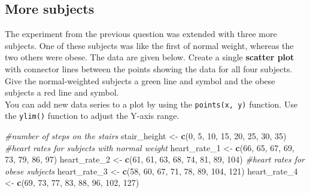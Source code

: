 \documentclass[]{book}
\newenvironment{Shaded}{\begin{snugshade}}{\end{snugshade}}
\newcommand{\CommentTok}[1]{\textcolor[rgb]{0.56,0.35,0.01}{\textit{#1}}}
\newcommand{\DecValTok}[1]{\textcolor[rgb]{0.00,0.00,0.81}{#1}}
\newcommand{\KeywordTok}[1]{\textcolor[rgb]{0.13,0.29,0.53}{\textbf{#1}}}
\newcommand{\NormalTok}[1]{#1}
\newcommand{\StringTok}[1]{\textcolor[rgb]{0.31,0.60,0.02}{#1}}
\begin{document}
\hypertarget{more-subjects}{%
\subsection{More subjects}\label{more-subjects}}

The experiment from the previous question was extended with three more subjects. One of these subjects was like the first of normal weight, whereas the two others were obese. The data are given below. Create a single \textbf{scatter plot} with connector lines between the points showing the data for all four subjects. Give the normal-weighted subjects a green line and symbol and the obese subjects a red line and symbol.\\
You can add new data series to a plot by using the \texttt{points(x,\ y)} function. Use the \texttt{ylim()} function to adjust the Y-axis range.

\begin{Shaded}
\begin{Highlighting}[]
\CommentTok{#number of steps on the stairs}
\NormalTok{stair_height <-}\StringTok{ }\KeywordTok{c}\NormalTok{(}\DecValTok{0}\NormalTok{, }\DecValTok{5}\NormalTok{, }\DecValTok{10}\NormalTok{, }\DecValTok{15}\NormalTok{, }\DecValTok{20}\NormalTok{, }\DecValTok{25}\NormalTok{, }\DecValTok{30}\NormalTok{, }\DecValTok{35}\NormalTok{)}
\CommentTok{#heart rates for subjects with normal weight}
\NormalTok{heart_rate_}\DecValTok{1}\NormalTok{ <-}\StringTok{ }\KeywordTok{c}\NormalTok{(}\DecValTok{66}\NormalTok{, }\DecValTok{65}\NormalTok{, }\DecValTok{67}\NormalTok{, }\DecValTok{69}\NormalTok{, }\DecValTok{73}\NormalTok{, }\DecValTok{79}\NormalTok{, }\DecValTok{86}\NormalTok{, }\DecValTok{97}\NormalTok{)}
\NormalTok{heart_rate_}\DecValTok{2}\NormalTok{ <-}\StringTok{ }\KeywordTok{c}\NormalTok{(}\DecValTok{61}\NormalTok{, }\DecValTok{61}\NormalTok{, }\DecValTok{63}\NormalTok{, }\DecValTok{68}\NormalTok{, }\DecValTok{74}\NormalTok{, }\DecValTok{81}\NormalTok{, }\DecValTok{89}\NormalTok{, }\DecValTok{104}\NormalTok{)}
\CommentTok{#heart rates for obese subjects}
\NormalTok{heart_rate_}\DecValTok{3}\NormalTok{ <-}\StringTok{ }\KeywordTok{c}\NormalTok{(}\DecValTok{58}\NormalTok{, }\DecValTok{60}\NormalTok{, }\DecValTok{67}\NormalTok{, }\DecValTok{71}\NormalTok{, }\DecValTok{78}\NormalTok{, }\DecValTok{89}\NormalTok{, }\DecValTok{104}\NormalTok{, }\DecValTok{121}\NormalTok{)}
\NormalTok{heart_rate_}\DecValTok{4}\NormalTok{ <-}\StringTok{ }\KeywordTok{c}\NormalTok{(}\DecValTok{69}\NormalTok{, }\DecValTok{73}\NormalTok{, }\DecValTok{77}\NormalTok{, }\DecValTok{83}\NormalTok{, }\DecValTok{88}\NormalTok{, }\DecValTok{96}\NormalTok{, }\DecValTok{102}\NormalTok{, }\DecValTok{127}\NormalTok{)}
\end{Highlighting}
\end{Shaded}
\end{document}
